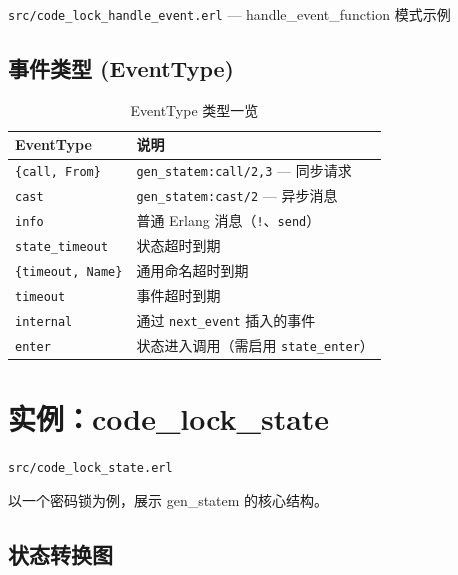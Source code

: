 \documentclass[a4paper,11pt]{article}
\begin{document}
\begin{notebox}[源码文件]
\texttt{src/code\_lock\_handle\_event.erl} --- handle\_event\_function 模式示例
\end{notebox}

\subsection{事件类型 (EventType)}

\begin{table}[H]
\centering
\begin{tabular}{@{}ll@{}}
\toprule
\textbf{EventType} & \textbf{说明} \\
\midrule
\texttt{\{call, From\}} & \texttt{gen\_statem:call/2,3} --- 同步请求 \\
\texttt{cast} & \texttt{gen\_statem:cast/2} --- 异步消息 \\
\texttt{info} & 普通 Erlang 消息（\texttt{!}、\texttt{send}） \\
\texttt{state\_timeout} & 状态超时到期 \\
\texttt{\{timeout, Name\}} & 通用命名超时到期 \\
\texttt{timeout} & 事件超时到期 \\
\texttt{internal} & 通过 \texttt{next\_event} 插入的事件 \\
\texttt{enter} & 状态进入调用（需启用 \texttt{state\_enter}） \\
\bottomrule
\end{tabular}
\caption{EventType 类型一览}
\end{table}


\section{实例：code\_lock\_state}

\begin{notebox}[源码文件]
\texttt{src/code\_lock\_state.erl}
\end{notebox}

以一个密码锁为例，展示 gen\_statem 的核心结构。

\subsection{状态转换图}
\end{document}
